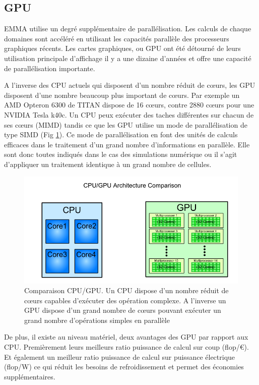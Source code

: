 \subsection{GPU}

EMMA utilise un degré supplémentaire de parallélisation.
Les calculs de chaque domaines sont accéléré en utilisant les capacités parallèle des processeurs graphiques récents.
Les cartes graphiques, ou \ac{GPU} ont été détourné de leurs utilisation principale d'affichage il y a une dizaine d'années et offre une capacité de parallélisation importante. 

A l'inverse des \ac{CPU} actuels qui disposent d'un nombre réduit de cœurs, les \ac{GPU} disposent d'une nombre beaucoup plus important de cœurs.
Par exemple un AMD Opteron 6300 de TITAN dispose de 16 cœurs, contre 2880 cœurs pour une NVIDIA Tesla k40c.
Un  \ac{CPU} peux exécuter des taches différentes sur chacun de ses cœurs (MIMD) tandis ce que les \ac{GPU} utilise un mode de parallélisation de type SIMD (Fig \ref{fig:cpugpu}).
Ce mode de parallélisation en font des unités de calculs efficaces dans le traitement d'un grand nombre d'informations en parallèle.
Elle sont donc toutes indiqués dans le cas des simulations numérique ou il s'agit d'appliquer un traitement identique à un grand nombre de cellules.

\begin{figure}[bth]
        \includegraphics[width=.95\linewidth]{img/02/cpu_vs_gpu.png} 
        \caption[Comparaison CPU/GPU]{Comparaison CPU/GPU. Un \ac{CPU} dispose d'un nombre réduit de cœurs capables d’exécuter des opération complexe. 
        A l'inverse un \ac{GPU} dispose d'un grand nombre de cœurs pouvant exécuter un grand nombre d'opérations simples en parallèle}
 		\label{fig:cpugpu}
\end{figure} 

De plus, il existe au niveau matériel, deux avantages des \ac{GPU} par rapport aux \ac{CPU}.
Premièrement leurs meilleurs ratio puissance de calcul sur coup (flop/€).
Et également un meilleur ratio puissance de calcul sur puissance électrique (flop/W) ce qui réduit les besoins de refroidissement et permet des économies supplémentaires.

